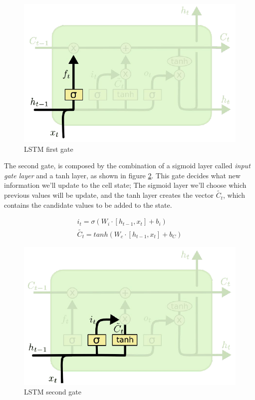 \documentclass[12pt]{report}
\begin{document}
\begin{figure}[!h]
\centering
\includegraphics[scale=0.5]{lstm3.pdf}
\caption{LSTM first gate}
\label{fig:lstm3}
\end{figure}

The second gate, is composed by the combination of a sigmoid layer called \textit{input gate layer} and a tanh layer, as shown in figure \ref{fig:lstm4}. This gate decides what new information we'll update to the cell state; The sigmoid layer we'll choose which previous values will be update, and the tanh layer creates the vector $\tilde{C_t}$, which contains the candidate values to be added to the state.

\begin{gather}
i_t = \sigma(W_i \cdot [h_{t-1},x_t] + b_i) \label{eq:it}\\
\tilde{C_t} = tanh(W_c \cdot [h_{t-1},x_t] + b_C) \label{eq:c_tilde}
\end{gather}

\begin{figure}[!ht]
\centering
\includegraphics[scale=0.5]{lstm4.pdf}
\caption{LSTM second gate}
\label{fig:lstm4}
\end{figure}
\end{document}
